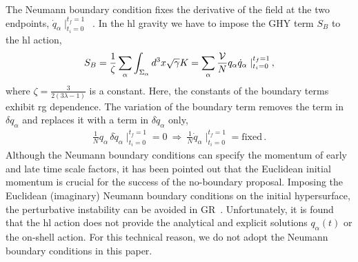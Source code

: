 \documentclass[superscriptaddress,aps,preprintnumbers,nofootinbib]{revtex4-2}
\begin{document}
The Neumann boundary condition fixes the derivative of the field at the two endpoints, $\dot{q}_{\alpha}\mid^{t_{f}=1}_{t_{i}=0}$~\cite{Krishnan:2016mcj}. In the \ac{hl} gravity we have to impose the GHY term $S_B$ to the \ac{hl} action, 
\begin{equation}
S_B=\frac{1}{\zeta}\sum_{\alpha} \int_{\Sigma_{\alpha}}d^3x \sqrt{\gamma}K= \sum_{\alpha}\frac{{\cal V}}{N}q_{\alpha}\dot{q}_{\alpha}\mid^{t_{f}=1}_{t_{i}=0}\,,
\end{equation}
where $\zeta=\frac{3}{2(3\lambda-1)}$ is a constant. Here, the constants of the boundary terms exhibit \ac{rg} dependence. The variation of the boundary term removes the term in $\delta q_{\alpha}$ and replaces it with a term in $\delta \dot{q}_{\alpha}$ only,
\begin{align}
\frac{1}{N}q_{\alpha}\,\delta\dot{q}_{\alpha}\mid^{t_{f}=1}_{t_{i}=0} = 0\ 
\Longrightarrow \ \frac{1}{N}\dot{q}_{\alpha}\mid^{t_{f}=1}_{t_{i}=0} = \textrm{fixed} \,. 
\end{align}
Although the Neumann boundary conditions can specify the momentum of early and late time scale factors, it has been pointed out that the Euclidean initial momentum is crucial for the success of the no-boundary proposal. Imposing the Euclidean (imaginary) Neumann boundary conditions on the initial hypersurface, the perturbative instability can be avoided in GR~\cite{DiTucci:2019dji,DiTucci:2019bui}. Unfortunately, it is found that the \ac{hl} action does not provide the analytical and explicit solutions $q_{\alpha}(t)$ or the on-shell action. For this technical reason, we do not adopt the Neumann boundary conditions in this paper. 
\end{document}
